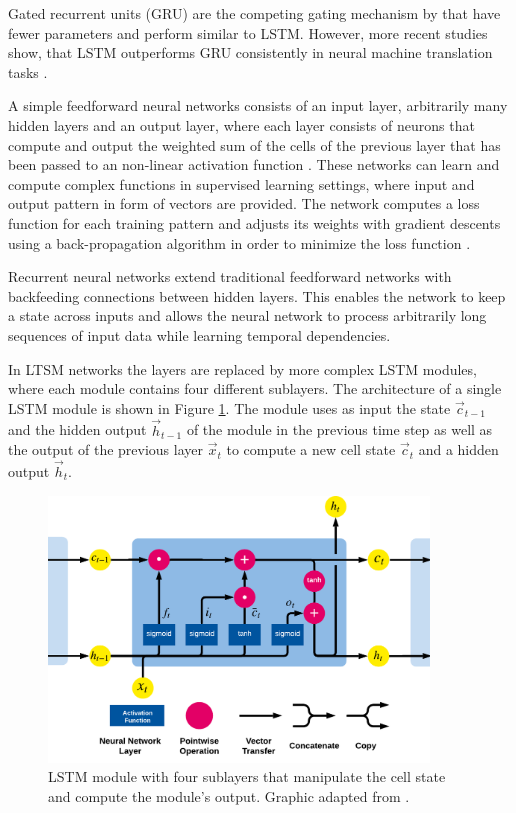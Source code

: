 Gated recurrent units (GRU) \cite{DBLP:conf/emnlp/ChoMGBBSB14} are the competing gating mechanism by \citeauthor{DBLP:conf/emnlp/ChoMGBBSB14} that have fewer parameters and perform similar to LSTM.
However, more recent studies show, that LSTM outperforms GRU consistently in neural machine translation tasks  \cite{DBLP:journals/corr/BritzGLL17}.

A simple feedforward neural networks consists of an input layer, arbitrarily many hidden layers and an output layer, where each layer consists of neurons that compute and output the weighted sum of the cells of the previous layer that has been passed to an non-linear activation function \cite{DBLP:journals/nn/Schmidhuber15}.
These networks can learn and compute complex functions in supervised learning settings, where input and output pattern in form of vectors are provided.
The network computes a loss function for each training pattern and adjusts its weights with gradient descents using a back-propagation algorithm in order to minimize the loss function \cite{rumelhart1986learning}.

Recurrent neural networks extend traditional feedforward networks with backfeeding connections between hidden layers.
This enables the network to keep a state across inputs and allows the neural network to process arbitrarily long sequences of input data while learning temporal dependencies.

In LTSM networks the layers are replaced by more complex LSTM modules, where each module contains four different sublayers.
The architecture of a single LSTM module is shown in Figure \ref{fig:lstm-module}.
The module uses as input the state $\vec{c}_{t-1}$ and the hidden output $\vec{h}_{t-1}$ of the module in the previous time step as well as the output of the previous layer $\vec{x}_t$ to compute a new cell state $\vec{c}_{t}$ and a hidden output $\vec{h}_{t}$.

\begin{figure}[htbp!]
	\centering
	\includegraphics[width=0.9\textwidth]{figures/lstm-module}
	\caption[Structure of an LSTM module]{LSTM module with four sublayers that manipulate the cell state and compute the module's output. Graphic adapted from \cite{lstm-blog}.}
	\label{fig:lstm-module}
\end{figure}

